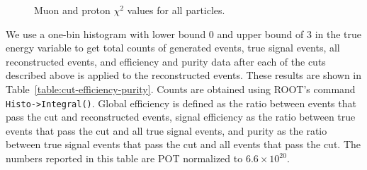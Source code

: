 \documentclass{article}
\begin{document}
\begin{figure}
    \centering
    \caption{Muon and proton $\chi^2$ values for all particles.}
    \label{fig:chi-2-variables}
\end{figure}

We use a one-bin histogram with lower bound $0$ and upper bound of $3$ in the true energy variable to get total counts of generated events, true signal events, all reconstructed events, and efficiency and purity data after each of the cuts described above is applied to the reconstructed events. 
These results are shown in Table~\ref{table:cut-efficiency-purity}. Counts are obtained using ROOT's command \verb|Histo->Integral()|. Global efficiency is defined as the ratio between events that pass the cut and reconstructed events, signal efficiency as the ratio between true events that pass the cut and all true signal events, and purity as the ratio between true signal events that pass the cut and all events that pass the cut.
The numbers reported in this table are POT normalized to $6.6 \times 10^{20}$.
\end{document}
